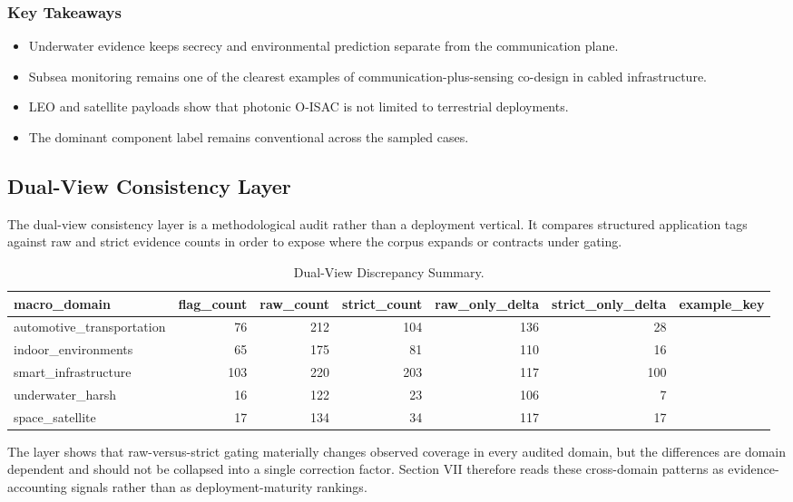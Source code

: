 \subsubsection{Key Takeaways}
\begin{itemize}
\item Underwater evidence keeps secrecy and environmental prediction separate from the communication plane.
\item Subsea monitoring remains one of the clearest examples of communication-plus-sensing co-design in cabled infrastructure.
\item LEO and satellite payloads show that photonic O-ISAC is not limited to terrestrial deployments.
\item The dominant component label remains conventional across the sampled cases.
\end{itemize}

\subsection{Dual-View Consistency Layer}
\label{subsec:apps-dualview}

The dual-view consistency layer is a methodological audit rather than a deployment vertical. It compares structured application tags against raw and strict evidence counts in order to expose where the corpus expands or contracts under gating.

\begin{table}[!t]
\caption{Dual-View Discrepancy Summary.}
\label{tab:dualview-summary}
\centering
\scriptsize
\begin{tabular}{lrrrrrl}
\toprule
macro\_domain & flag\_count & raw\_count & strict\_count & raw\_only\_delta & strict\_only\_delta & example\_key \\
\midrule
automotive\_transportation & 76 & 212 & 104 & 136 & 28 & \cite{O_ISAC_010} \\
indoor\_environments & 65 & 175 & 81 & 110 & 16 & \cite{O_ISAC_013} \\
smart\_infrastructure & 103 & 220 & 203 & 117 & 100 & \cite{O_ISAC_071} \\
underwater\_harsh & 16 & 122 & 23 & 106 & 7 & \cite{O_ISAC_021} \\
space\_satellite & 17 & 134 & 34 & 117 & 17 & \cite{O_ISAC_070} \\
\bottomrule
\end{tabular}
\end{table}

The layer shows that raw-versus-strict gating materially changes observed coverage in every audited domain, but the differences are domain dependent and should not be collapsed into a single correction factor. Section VII therefore reads these cross-domain patterns as evidence-accounting signals rather than as deployment-maturity rankings.

